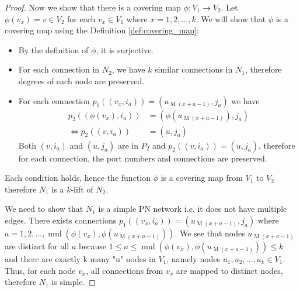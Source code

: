 \begin{proof}
    Now we show that there is a covering map $\phi: V_1 \rightarrow V_2$.
    Let $\phi(v_x) = v \in V_2$ for each $v_x \in V_1$ where $x=1, 2, ..., k$.
    We will show that $\phi$ is a covering map using the Definition \ref{def:covering_map}:
    \begin{itemize}
        \item By the definition of $\phi$, it is surjective.
        \item For each connection in $N_2$, we have $k$ similar connections in $N_1$, therefore degrees of each node are preserved.
        \item For each connection $p_1((v_{x}, i_a)) = (u_{\operatorname{M}(x+a-1)}, j_a)$ we have
        \begin{align*}
           p_2((\phi(v_{x}), i_a)) &= (\phi(u_{\operatorname{M}(x+a-1)}), j_a)\\
           \Leftrightarrow p_2((v, i_a)) &= (u, j_a)
        \end{align*}
        Both $(v, i_a)$ and $(u, j_a)$ are in $P_2$ and $p_2((v, i_a)) = (u, j_a)$, therefore for each connection, the port numbers and connections are preserved.
    \end{itemize}
    Each condition holds, hence the function $\phi$ is a covering map from $V_1$ to $V_2$
    therefore $N_1$ is a $k$-lift of $N_2$.

    We need to show that $N_1$ is a simple PN network i.e. it does not have multiple edges.
    There exists connections $p_1((v_{x}, i_a)) = (u_{\operatorname{M}(x+a-1)}, j_a)$ where $a=1, 2, ..., \operatorname{mul}(\phi(v_{x}),\phi(u_{\operatorname{M}(x+a-1)}))$.
    We see that nodes $u_{\operatorname{M}(x+a-1)}$ are distinct for all $a$ because $1 \leq a \leq \operatorname{mul}(\phi(v_{x}),\phi(u_{\operatorname{M}(x+a-1)})) \leq k$ and
    there are exactly k many "u" nodes in $V_1$, namely nodes $u_1, u_2, ..., u_k \in V_1$.
    Thus, for each node $v_x$, all connections from $v_x$ are mapped to distinct nodes, therefore $N_1$ is simple.


\end{proof}
